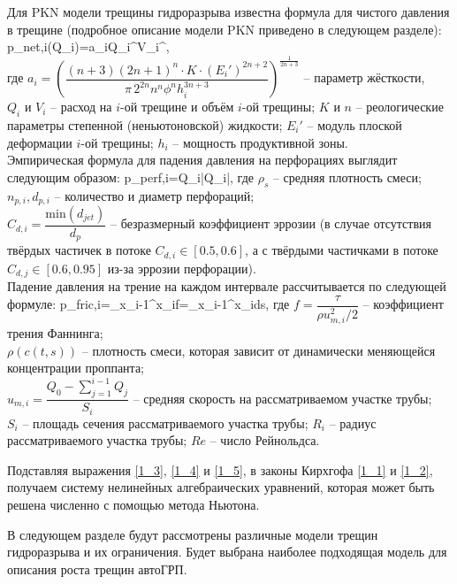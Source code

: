 Для PKN модели трещины гидроразрыва известна формула для чистого давления в трещине (подробное описание модели PKN приведено в следующем разделе):
\beq\label{1_3}
p_{net,i}(Q_i)=a_iQ_i^{}V_i^{},
\eeq
\ \\
где $a_i=\left(\dfrac{(n+3)(2n+1)^n \cdot K\cdot (E_i')^{2n+2}}{\pi\, 2^{2n}n^n\phi^n h_i^{3n+3}}\right)^{\!\frac{1}{2n+3}}$ -- параметр жёсткости,\newline\\
$Q_i$ и $V_i$ -- расход на $i$-ой трещине и объём $i$-ой трещины;\newline
$K$ и $n$ -- реологические параметры степенной (неньютоновской) жидкости;\newline
$E_i'$ -- модуль плоской деформации $i$-ой трещины;\newline
$h_i$ -- мощность продуктивной зоны.
\\

Эмпирическая формула для падения давления на перфорациях выглядит следующим образом:
\beq\label{1_4}
\Delta p_{perf,i}=Q_i\left|Q_i\right|,
\eeq
где $\rho_s$ -- средняя плотность смеси;\newline
$n_{p,i}, d_{p,i}$ -- количество и диаметр перфораций;\newline\\
$C_{d,i}=\dfrac{\text{min}(d_{jet})}{d_p}$ -- безразмерный коэффициент эррозии (в случае отсутствия твёрдых частичек в потоке $C_{d,i}\in\left[0.5,0.6\right]$, а с твёрдыми частичками в потоке $C_{d,j}\in\left[0.6,0.95\right]$  из-за эррозии перфорации).
\\

Падение давления на трение на каждом интервале рассчитывается по следующей формуле:
\beq\label{1_5}
\Delta p_{fric,i}=\int\limits_{x_{i-1}}^{x_i}{f}=\int\limits_{x_{i-1}}^{x_i}{}ds,
\eeq
где $f=\dfrac{\tau}{\rho u_{m,i}^2/2}$ -- коэффициент трения Фаннинга;\newline\\
$\rho(c(t,s))$ -- плотность смеси, которая зависит от динамически меняющейся концентрации проппанта;\newline\\
$u_{m,i}=\dfrac{Q_0-\sum\limits_{j=1}^{i-1}{Q_j}}{S_i}$ -- средняя скорость на рассматриваемом участке трубы;\newline\\
$S_i$ -- площадь сечения рассматриваемого участка трубы;\newline
$R_i$ -- радиус рассматриваемого участка трубы;\newline
$Re$ -- число Рейнольдса.

Подставляя выражения \eqref{1_3}, \eqref{1_4} и \eqref{1_5}, в законы Кирхгофа \eqref{1_1} и \eqref{1_2}, получаем систему нелинейных алгебраических уравнений, которая может быть решена численно с помощью метода Ньютона.

В следующем разделе будут рассмотрены различные модели трещин гидроразрыва и их ограничения.
Будет выбрана наиболее подходящая модель для описания роста трещин автоГРП.



